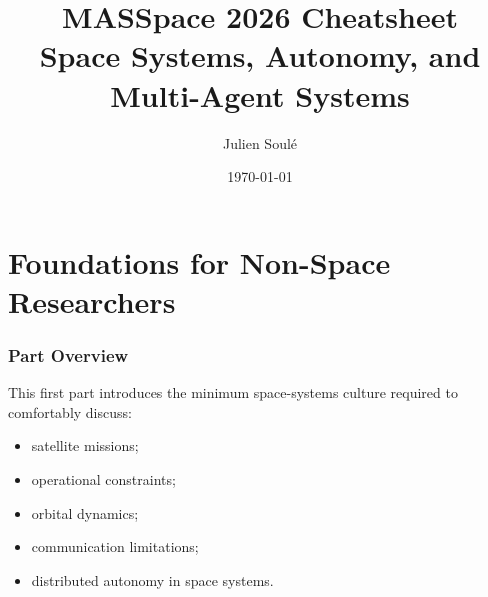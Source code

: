 \documentclass[10pt,a4paper,twocolumn]{article}
\title{\tiny \textbf{MASSpace 2026 Cheatsheet} \\ Space Systems, Autonomy, and Multi-Agent Systems}
\author{\tiny Julien Soulé}
\date{\tiny \today}
\begin{document}

\maketitle









\part{Foundations for Non-Space Researchers}


\section*{Part Overview}

This first part introduces the minimum space-systems culture required to comfortably discuss:
\begin{itemize}
    \item satellite missions;
    \item operational constraints;
    \item orbital dynamics;
    \item communication limitations;
    \item distributed autonomy in space systems.
\end{itemize}
\end{document}
